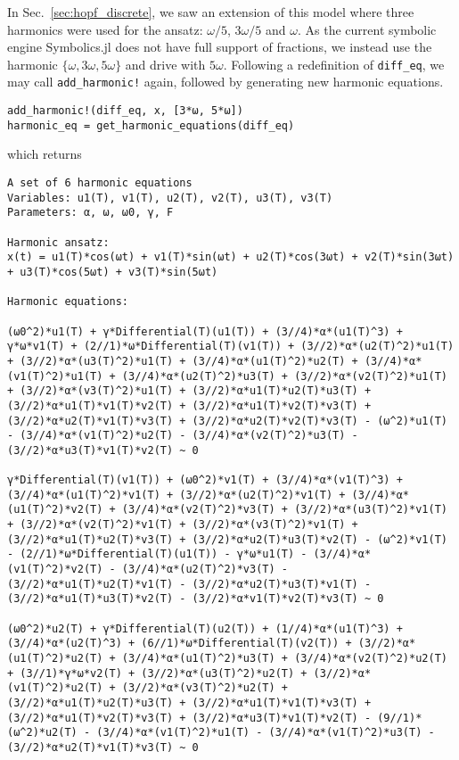 In Sec.~\ref{sec:hopf_discrete}, we saw an extension of this model where three harmonics were used for the ansatz: $\omega/5$, $3\omega/5$ and $\omega$. As the current symbolic engine Symbolics.jl does not have full support of fractions, we instead use the harmonic $\{ \omega, 3\omega, 5\omega \}$ and drive with $5 \omega$. Following a redefinition of \texttt{diff_eq}, we may call \texttt{add\_harmonic!} again, followed by generating new harmonic equations.
\begin{lstlisting}[numbers=none]
add_harmonic!(diff_eq, x, [3*ω, 5*ω]) 
harmonic_eq = get_harmonic_equations(diff_eq)
\end{lstlisting}
%
which returns
\begin{lstlisting}[numbers=none, basicstyle=\scriptsize\ttfamily]
A set of 6 harmonic equations
Variables: u1(T), v1(T), u2(T), v2(T), u3(T), v3(T)
Parameters: α, ω, ω0, γ, F

Harmonic ansatz: 
x(t) = u1(T)*cos(ωt) + v1(T)*sin(ωt) + u2(T)*cos(3ωt) + v2(T)*sin(3ωt) + u3(T)*cos(5ωt) + v3(T)*sin(5ωt)

Harmonic equations:

(ω0^2)*u1(T) + γ*Differential(T)(u1(T)) + (3//4)*α*(u1(T)^3) + γ*ω*v1(T) + (2//1)*ω*Differential(T)(v1(T)) + (3//2)*α*(u2(T)^2)*u1(T) + (3//2)*α*(u3(T)^2)*u1(T) + (3//4)*α*(u1(T)^2)*u2(T) + (3//4)*α*(v1(T)^2)*u1(T) + (3//4)*α*(u2(T)^2)*u3(T) + (3//2)*α*(v2(T)^2)*u1(T) + (3//2)*α*(v3(T)^2)*u1(T) + (3//2)*α*u1(T)*u2(T)*u3(T) + (3//2)*α*u1(T)*v1(T)*v2(T) + (3//2)*α*u1(T)*v2(T)*v3(T) + (3//2)*α*u2(T)*v1(T)*v3(T) + (3//2)*α*u2(T)*v2(T)*v3(T) - (ω^2)*u1(T) - (3//4)*α*(v1(T)^2)*u2(T) - (3//4)*α*(v2(T)^2)*u3(T) - (3//2)*α*u3(T)*v1(T)*v2(T) ~ 0

γ*Differential(T)(v1(T)) + (ω0^2)*v1(T) + (3//4)*α*(v1(T)^3) + (3//4)*α*(u1(T)^2)*v1(T) + (3//2)*α*(u2(T)^2)*v1(T) + (3//4)*α*(u1(T)^2)*v2(T) + (3//4)*α*(v2(T)^2)*v3(T) + (3//2)*α*(u3(T)^2)*v1(T) + (3//2)*α*(v2(T)^2)*v1(T) + (3//2)*α*(v3(T)^2)*v1(T) + (3//2)*α*u1(T)*u2(T)*v3(T) + (3//2)*α*u2(T)*u3(T)*v2(T) - (ω^2)*v1(T) - (2//1)*ω*Differential(T)(u1(T)) - γ*ω*u1(T) - (3//4)*α*(v1(T)^2)*v2(T) - (3//4)*α*(u2(T)^2)*v3(T) - (3//2)*α*u1(T)*u2(T)*v1(T) - (3//2)*α*u2(T)*u3(T)*v1(T) - (3//2)*α*u1(T)*u3(T)*v2(T) - (3//2)*α*v1(T)*v2(T)*v3(T) ~ 0

(ω0^2)*u2(T) + γ*Differential(T)(u2(T)) + (1//4)*α*(u1(T)^3) + (3//4)*α*(u2(T)^3) + (6//1)*ω*Differential(T)(v2(T)) + (3//2)*α*(u1(T)^2)*u2(T) + (3//4)*α*(u1(T)^2)*u3(T) + (3//4)*α*(v2(T)^2)*u2(T) + (3//1)*γ*ω*v2(T) + (3//2)*α*(u3(T)^2)*u2(T) + (3//2)*α*(v1(T)^2)*u2(T) + (3//2)*α*(v3(T)^2)*u2(T) + (3//2)*α*u1(T)*u2(T)*u3(T) + (3//2)*α*u1(T)*v1(T)*v3(T) + (3//2)*α*u1(T)*v2(T)*v3(T) + (3//2)*α*u3(T)*v1(T)*v2(T) - (9//1)*(ω^2)*u2(T) - (3//4)*α*(v1(T)^2)*u1(T) - (3//4)*α*(v1(T)^2)*u3(T) - (3//2)*α*u2(T)*v1(T)*v3(T) ~ 0


\end{lstlisting}
